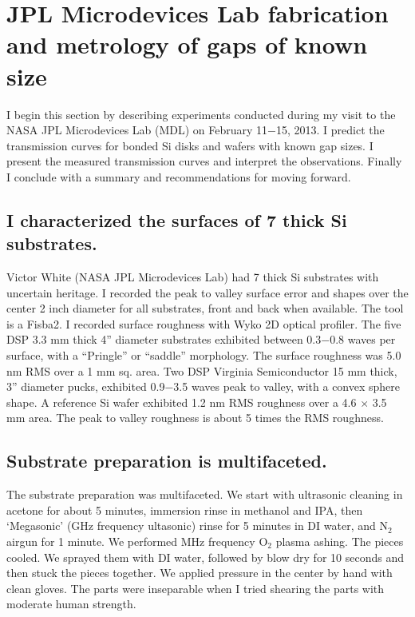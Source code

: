 \section{JPL Microdevices Lab fabrication and metrology of gaps of known size}

I begin this section by describing experiments conducted during my visit to the NASA JPL Microdevices Lab (MDL) on February 11$-$15, 2013.  I predict the transmission curves for bonded Si disks and wafers with known gap sizes.  I present the measured transmission curves and interpret the observations.  Finally I conclude with a summary and recommendations for moving forward.

\subsection{I characterized the surfaces of 7 thick Si substrates.}

Victor White (NASA JPL Microdevices Lab) had 7 thick Si substrates with uncertain heritage.  I recorded the peak to valley surface error and shapes over the center 2 inch diameter for all substrates, front and back when available.  The tool is a Fisba2.  I recorded surface roughness with Wyko 2D optical profiler.  The five DSP 3.3 mm thick 4'' diameter substrates exhibited between 0.3$-$0.8 waves per surface, with a ``Pringle'' or ``saddle'' morphology.  The surface roughness was 5.0 nm RMS over a 1 mm sq. area.  Two DSP Virginia Semiconductor 15 mm thick, 3'' diameter pucks, exhibited 0.9$-$3.5 waves peak to valley, with a convex sphere shape.  A reference Si wafer exhibited 1.2 nm RMS roughness over a 4.6 $\times$ 3.5 mm area.  The peak to valley roughness is about 5 times the RMS roughness.  

\subsection{Substrate preparation is multifaceted.}

The substrate preparation was multifaceted.  We start with ultrasonic cleaning in acetone for about 5 minutes, immersion rinse in methanol and IPA, then `Megasonic' (GHz frequency ultasonic) rinse for 5 minutes in DI water, and N$_2$ airgun for 1 minute.  We performed MHz frequency O$_2$ plasma ashing.  The pieces cooled.  We sprayed them with DI water, followed by blow dry for 10 seconds and then stuck the pieces together.  We applied pressure in the center by hand with clean gloves.  The parts were inseparable when I tried shearing the parts with moderate human strength.

